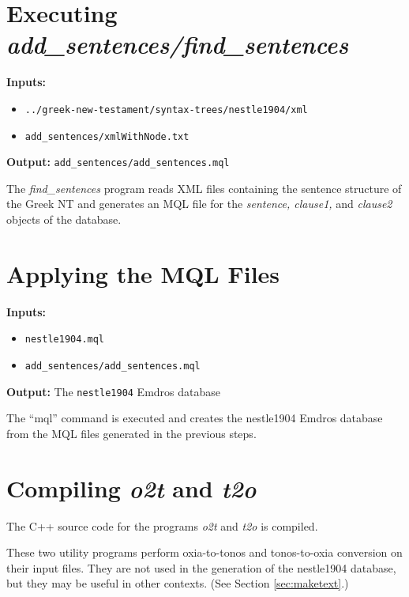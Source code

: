 \documentclass[11pt,oneside,a4paper,article]{memoir}
\begin{document}
\section{Executing \emph{add\_sentences/find\_sentences}}


\noindent \textbf{Inputs:}
\begin{itemize}
\item \texttt{../greek-new-testament/syntax-trees/nestle1904/xml}
\item \texttt{add\_sentences/xmlWithNode.txt}
\end{itemize}

\noindent \textbf{Output:} \texttt{add\_sentences/add\_sentences.mql}

\vspace{1ex}

\noindent
The \emph{find\_sentences} program reads XML files containing the sentence structure of the Greek NT and
generates an MQL file for the \emph{sentence, clause1,} and \emph{clause2} objects of the database.


\section{Applying the MQL Files}

\noindent \textbf{Inputs:}
\begin{itemize}
\item \texttt{nestle1904.mql}
\item \texttt{add\_sentences/add\_sentences.mql}
\end{itemize}

\noindent \textbf{Output:} The \texttt{nestle1904} Emdros database

\vspace{1ex}

\noindent
The ``mql'' command is executed and creates the nestle1904 Emdros database from the MQL files
generated in the previous steps.


\section{Compiling \emph{o2t} and \emph{t2o}}

The C++ source code for the programs \emph{o2t} and \emph{t2o} is compiled.

These two utility programs perform oxia-to-tonos and tonos-to-oxia conversion on their input files.
They are not used in the generation of the nestle1904 database, but they may be useful in other
contexts. (See Section \ref{sec:maketext}.)
\end{document}
